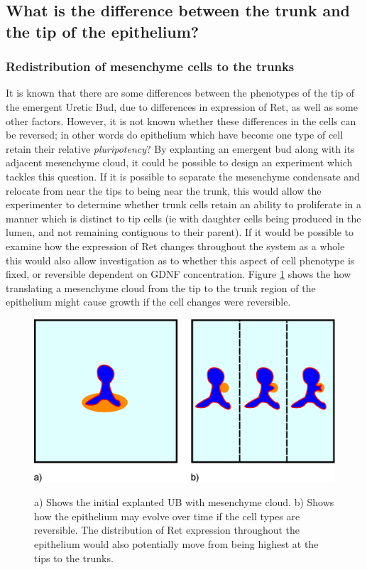 \documentclass[pdftex,10pt,a4paper]{article}
\begin{document}
\subsection{What is the difference between the trunk and the tip of the epithelium?}
\subsubsection{Redistribution of mesenchyme cells to the trunks}\label{sec:redistribution}
It is known that there are some differences between the phenotypes of the tip of the emergent Uretic Bud, due to differences in expression of Ret, as well as some other factors. However, it is not known whether these differences in the cells can be reversed; in other words do epithelium which have become one type of cell retain their relative \textit{pluripotency}? By explanting an emergent bud along with its adjacent mesenchyme cloud, it could be possible to design an experiment which tackles this question. If it is possible to separate the mesenchyme condensate and relocate from near the tips to being near the trunk, this would allow the experimenter to determine whether trunk cells retain an ability to proliferate in a manner which is distinct to tip cells (ie with daughter cells being produced in the lumen, and not remaining contiguous to their parent). If it would be possible to examine how the expression of Ret changes throughout the system as a whole this would also allow investigation as to whether this aspect of cell phenotype is fixed, or reversible dependent on GDNF concentration. Figure \ref{fig:tiptrunk} shows the how translating a mesenchyme cloud from the tip to the trunk region of the epithelium might cause growth if the cell changes were reversible.

\begin{figure}[t] 
\centering
\scalebox{0.25} 
{\includegraphics{experiments_4.eps}}
\caption{a) Shows the initial explanted UB with mesenchyme cloud. b) Shows how the epithelium may evolve over time if the cell types are reversible. The distribution of Ret expression throughout the epithelium would also potentially move from being highest at the tips to the trunks.} \label{fig:tiptrunk}
\end{figure} 
\end{document}
